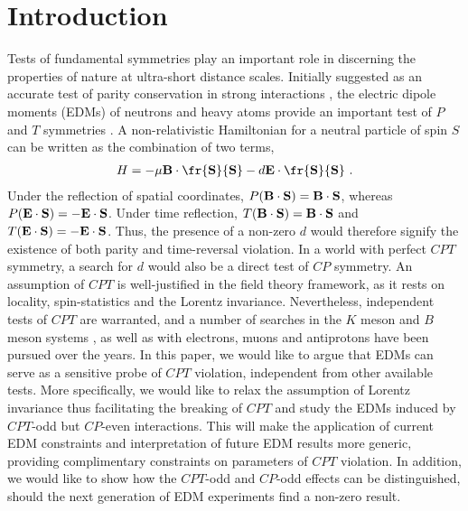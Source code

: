 \documentclass[prl,twocolumn,tightenlines,preprintnumbers,floatfix,nofootinbib]{revtex4}
\def\ba{\begin{eqnarray}}
\def\ea{\end{eqnarray}}
\begin{document}

\section{Introduction}

Tests of fundamental symmetries play an important 
role in discerning the properties of nature at 
ultra-short distance scales. Initially suggested as 
an accurate test of parity conservation in strong interactions 
\cite{PR}, the electric dipole moments (EDMs) of neutrons and heavy atoms 
provide an important test of $P$ and $T$ symmetries \cite{exp,KL,FG,PRann}. 
A non-relativistic Hamiltonian for a neutral particle of spin 
$S$ can be written as the combination of two terms,
\ba
 H = - \mu {\bf B} \cdot \fr{\bf{S}}{S} - d {\bf E} \cdot \fr{\bf{S}}{S}\ .
\label{starting}
\ea
Under the reflection of spatial coordinates, $P({\bf B} \cdot \bf{S})= {\bf B} \cdot \bf{S}$, 
whereas $P({\bf E} \cdot \bf{S})= -{\bf E} \cdot \bf{S}$. Under time reflection, 
$T({\bf B} \cdot \bf{S})= {\bf B} \cdot \bf{S}$ and 
$T({\bf E} \cdot \bf{S})= -{\bf E} \cdot \bf{S}$. Thus, the presence of a non-zero $d$
would therefore signify the existence of both parity and time-reversal
violation. In a world with perfect $CPT$ symmetry, a search for $d$ would also 
be a direct test of $CP$ symmetry. 
An assumption of $CPT$ is well-justified 
in the field theory framework, as it rests on locality, spin-statistics and the 
Lorentz invariance. Nevertheless, independent tests of $CPT$ are warranted, and a
number of searches in the $K$ meson and $B$ meson systems \cite{K_CPT},
as well as with electrons, muons and antiprotons have been pursued over the years. 
In this paper, we would like to argue that EDMs can serve as a sensitive 
probe of $CPT$ violation, independent from other available tests.
More specifically, we would like to relax the assumption of Lorentz invariance 
thus facilitating the breaking of $CPT$ and study the EDMs induced by $CPT$-odd but $CP$-even 
interactions. This will make the application of current EDM constraints 
and interpretation of future EDM results more generic, providing complimentary 
constraints on parameters of $CPT$ violation. In addition, we would like to show how the 
$CPT$-odd and $CP$-odd effects can be distinguished, should the next generation
of EDM experiments find a non-zero result.
\end{document}
